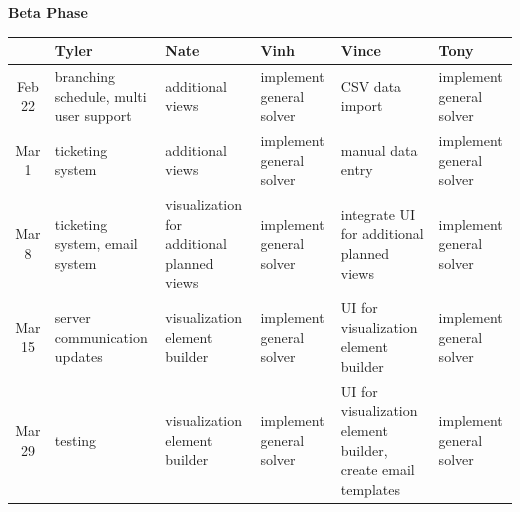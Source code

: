 \documentclass{extarticle}
\begin{document}
\begin{center}
\bf{Beta Phase}
\begin{table}[H]
\begin{tabular}{ c || p{3cm} | p{3cm} | p{3cm} | p{3cm} | p{3cm} |}
 & \bf{Tyler} & \bf{Nate} & \bf{Vinh} & \bf{Vince} & \bf{Tony} \\ \hline
Feb 22 & branching schedule, multi user support & additional views & implement general solver & CSV data import & implement general solver \\ \hline

Mar 1 & ticketing system & additional views & implement general solver & manual data entry & implement general solver \\ \hline

Mar 8  & ticketing system, email system & visualization for additional planned views & implement general solver & integrate UI for additional planned views  & implement general solver \\ \hline

Mar 15 & server communication updates & visualization element builder & implement general solver & UI for visualization element builder & implement general solver \\ \hline
Mar 29 & testing & visualization element builder & implement general solver & UI for visualization element builder, create email templates & implement general solver \\ \hline
\end{tabular}
\end{table}
\end{center}
\end{document}
